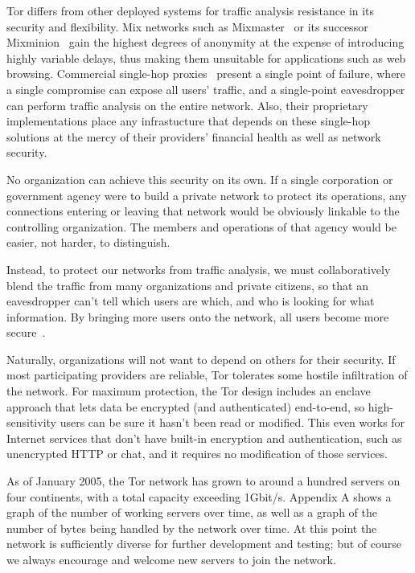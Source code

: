 \documentclass{llncs}
\begin{document}
Tor differs from other deployed systems for traffic analysis resistance
in its security and flexibility.  Mix networks such as
Mixmaster~\cite{mixmaster-spec} or its successor Mixminion~\cite{minion-design}
gain the highest degrees of anonymity at the expense of introducing highly
variable delays, thus making them unsuitable for applications such as web
browsing.  Commercial single-hop
proxies~\cite{anonymizer} present a single point of failure, where
a single compromise can expose all users' traffic, and a single-point
eavesdropper can perform traffic analysis on the entire network.
Also, their proprietary implementations place any infrastucture that
depends on these single-hop solutions at the mercy of their providers'
financial health as well as network security.

No organization can achieve this security on its own.  If a single
corporation or government agency were to build a private network to
protect its operations, any connections entering or leaving that network
would be obviously linkable to the controlling organization.  The members
and operations of that agency would be easier, not harder, to distinguish.

Instead, to protect our networks from traffic analysis, we must
collaboratively blend the traffic from many organizations and private
citizens, so that an eavesdropper can't tell which users are which,
and who is looking for what information.  By bringing more users onto
the network, all users become more secure~\cite{econymics}.

Naturally, organizations will not want to depend on others for their
security.  If most participating providers are reliable, Tor tolerates
some hostile infiltration of the network.  For maximum protection,
the Tor design includes an enclave approach that lets data be encrypted
(and authenticated) end-to-end, so high-sensitivity users can be sure it
hasn't been read or modified.  This even works for Internet services that
don't have built-in encryption and authentication, such as unencrypted
HTTP or chat, and it requires no modification of those services.

As of January 2005, the Tor network has grown to around a hundred servers
on four continents, with a total capacity exceeding 1Gbit/s. Appendix A
shows a graph of the number of working servers over time, as well as a
graph of the number of bytes being handled by the network over time. At
this point the network is sufficiently diverse for further development
and testing; but of course we always encourage and welcome new servers
to join the network.
\end{document}
